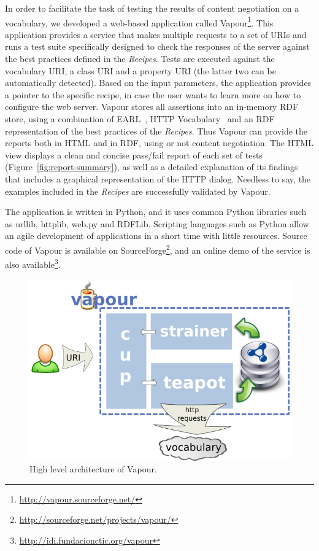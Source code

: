 \documentclass{../templates/llncs}
\begin{document}
In order to facilitate the task of testing the results of content 
negotiation on a vocabulary, we developed a web-based application 
called Vapour\footnote{\url{http://vapour.sourceforge.net/}}. This 
application provides a service that makes multiple requests to a set 
of URIs and runs a test suite specifically designed to check the responses 
of the server against the best practices defined in the \textit{Recipes}.
Tests are executed against the vocabulary
URI, a class URI and a property URI (the latter two can be automatically detected).
Based on the input parameters, the application provides a pointer to the specific
recipe, in case the user wants to learn more on how to configure the web server. 
Vapour stores all assertions into an in-memory RDF store, using a combination of EARL~\cite{EARL}, HTTP
Vocabulary~\cite{Koch2007} and an RDF representation of the best practices of the \textit{Recipes}. 
Thus Vapour can provide the reports both in HTML and in RDF, using or not content
negotiation. The HTML view displays a clean and concise pass/fail report of each 
set of tests (Figure~\ref{fig:report-summary}), as  well as a detailed explanation 
of its findings that includes a graphical representation of the HTTP dialog. Needless 
to say, the examples included in the \textit{Recipes} are successfully validated by 
Vapour.

The application is written in Python, and it uses common
Python libraries such as urllib, httplib, web.py and RDFLib. Scripting languages such 
as Python allow an agile development of applications in a short time with little 
resources. Source code of Vapour is available on 
SourceForge\footnote{\url{http://sourceforge.net/projects/vapour/}},
and an online demo of the service is also available\footnote{\url{http://idi.fundacionctic.org/vapour}}.

\begin{figure}
 \centering
 \includegraphics[width=12cm]{images/arch.png}
 \caption{\label{fig:arch}High level architecture of Vapour.}
\end{figure}
\end{document}
